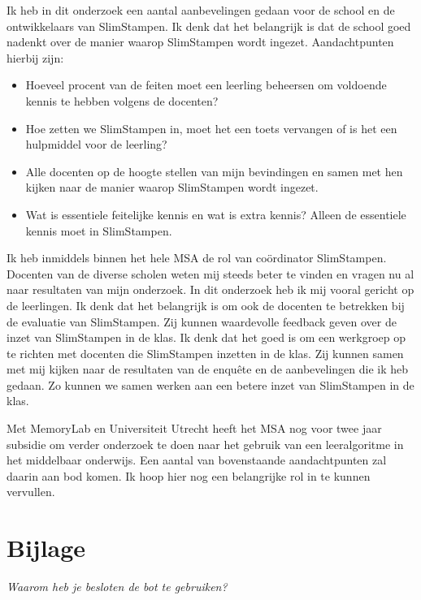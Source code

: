 \documentclass[12pt, a4paper]{article}
\begin{document}
Ik heb in dit onderzoek een aantal aanbevelingen gedaan voor de school en de ontwikkelaars van SlimStampen. Ik denk dat het belangrijk is dat de school goed nadenkt over de manier waarop SlimStampen wordt ingezet. Aandachtpunten hierbij zijn:
\begin{itemize}
    \item Hoeveel procent van de feiten moet een leerling beheersen om voldoende kennis te hebben volgens de docenten?
    \item Hoe zetten we SlimStampen in, moet het een toets vervangen of is het een hulpmiddel voor de leerling?
    \item Alle docenten op de hoogte stellen van mijn bevindingen en samen met hen kijken naar de manier waarop SlimStampen wordt ingezet.
    \item Wat is essentiele feitelijke kennis en wat is extra kennis? Alleen de essentiele kennis moet in SlimStampen.
\end{itemize}

Ik heb inmiddels binnen het hele MSA de rol van coördinator SlimStampen. Docenten van de diverse scholen weten mij steeds beter te vinden en vragen nu al naar resultaten van mijn onderzoek. In dit onderzoek heb ik mij vooral gericht op de leerlingen. Ik denk dat het belangrijk is om ook de docenten te betrekken bij de evaluatie van SlimStampen. Zij kunnen waardevolle feedback geven over de inzet van SlimStampen in de klas. Ik denk dat het goed is om een werkgroep op te richten met docenten die SlimStampen inzetten in de klas. Zij kunnen samen met mij kijken naar de resultaten van de enquête en de aanbevelingen die ik heb gedaan. Zo kunnen we samen werken aan een betere inzet van SlimStampen in de klas. 

Met MemoryLab en Universiteit Utrecht heeft het MSA nog voor twee jaar subsidie om verder onderzoek te doen naar het gebruik van een leeralgoritme in het middelbaar onderwijs. Een aantal van bovenstaande aandachtpunten zal daarin aan bod komen. Ik hoop hier nog een belangrijke rol in te kunnen vervullen.
\newpage
\appendix
\section{Bijlage}
\emph{Waarom heb je besloten de bot te gebruiken?}
\end{document}
